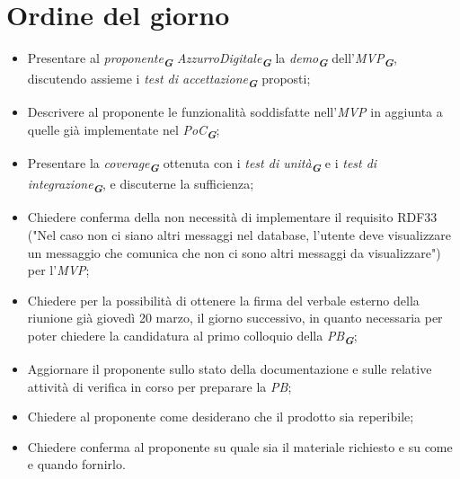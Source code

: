 

\section{Ordine del giorno}

\begin{itemize}
    \item Presentare al \emph{proponente}\textsubscript{\textbf{\textit{G}}} \emph{AzzurroDigitale}\textsubscript{\textbf{\textit{G}}}
    la \emph{demo}\textsubscript{\textbf{\textit{G}}} dell'\emph{MVP}\textsubscript{\textbf{\textit{G}}}, discutendo assieme i \emph{test di accettazione}\textsubscript{\textbf{\textit{G}}} proposti;
    \item Descrivere al proponente le funzionalità soddisfatte nell'\emph{MVP} in aggiunta a quelle già implementate nel \emph{PoC}\textsubscript{\textbf{\textit{G}}};
    \item Presentare la \emph{coverage}\textsubscript{\textbf{\textit{G}}} ottenuta con i \emph{test di unità}\textsubscript{\textbf{\textit{G}}} e i \emph{test di integrazione}\textsubscript{\textbf{\textit{G}}}, e discuterne la sufficienza;
    \item Chiedere conferma della non necessità di implementare il requisito RDF33 ("Nel caso non ci siano altri messaggi nel database, l'utente deve visualizzare un messaggio che comunica che non ci sono altri messaggi da visualizzare") per l'\emph{MVP};
    \item Chiedere per la possibilità di ottenere la firma del verbale esterno della riunione già giovedì 20 marzo, il giorno successivo, in quanto necessaria per poter chiedere la candidatura al primo colloquio della \emph{PB}\textsubscript{\textbf{\textit{G}}};
    \item Aggiornare il proponente sullo stato della documentazione e sulle relative attività di verifica in corso per preparare la \emph{PB};
    \item Chiedere al proponente come desiderano che il prodotto sia reperibile;
    \item Chiedere conferma al proponente su quale sia il materiale richiesto e su come e quando fornirlo.
\end{itemize}